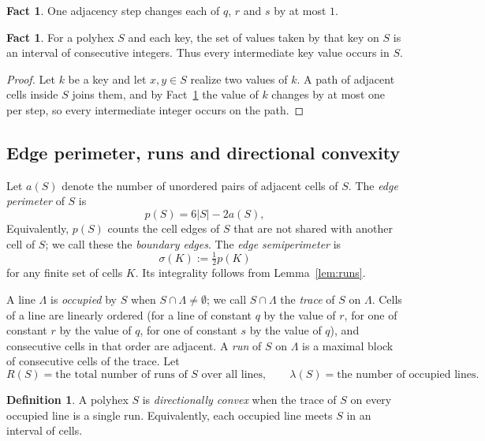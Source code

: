 \documentclass[11pt]{article}
\theoremstyle{plain}
\theoremstyle{definition}
\newtheorem{definition}[theorem]{Definition}
\newtheorem{fact}[theorem]{Fact}
\theoremstyle{remark}
\begin{document}
\begin{fact}\label{f:3}
One adjacency step changes each of \(q\), \(r\) and \(s\) by at most \(1\).
\end{fact}

\begin{fact}\label{f:4}
For a polyhex \(S\) and each key, the set of values taken by that key on \(S\) is an
interval of consecutive integers. Thus every intermediate key value occurs in \(S\).
\end{fact}

\begin{proof}
Let \(k\) be a key and let \(x,y\in S\) realize two values of \(k\). A path of adjacent
cells inside \(S\) joins them, and by Fact~\ref{f:3} the value of \(k\) changes by at most
one per step, so every intermediate integer occurs on the path.
\end{proof}

\subsection{Edge perimeter, runs and directional convexity}\label{sec:2.2}

Let \(a(S)\) denote the number of unordered pairs of adjacent cells of \(S\). The
\emph{edge perimeter} of \(S\) is
\begin{equation}\label{eq:p}
   p(S)=6|S|-2a(S),
\end{equation}
Equivalently, \(p(S)\) counts the cell edges of \(S\) that are not shared with another
cell of \(S\); we call these the \emph{boundary edges}. The \emph{edge semiperimeter} is
\[
   \sigma(K):=\tfrac{1}{2}p(K)
\]
for any finite set of cells \(K\). Its integrality follows from Lemma~\ref{lem:runs}.

A line \(\Lambda\) is \emph{occupied} by \(S\) when \(S\cap\Lambda\neq\emptyset\); we call
\(S\cap\Lambda\) the \emph{trace} of \(S\) on \(\Lambda\). Cells of a line are linearly
ordered (for a line of constant \(q\) by the value of \(r\), for one of constant \(r\) by
the value of \(q\), for one of constant \(s\) by the value of \(q\)), and consecutive
cells in that order are adjacent. A \emph{run} of \(S\) on \(\Lambda\) is a maximal block
of consecutive cells of the trace. Let
\[
   R(S)=\text{the total number of runs of \(S\) over all lines},\qquad
   \lambda(S)=\text{the number of occupied lines}.
\]

\begin{definition}\label{def:dconv}
A polyhex \(S\) is \emph{directionally convex} when the trace of \(S\) on every occupied
line is a single run. Equivalently, each occupied line meets \(S\) in an interval of cells.
\end{definition}
\end{document}
